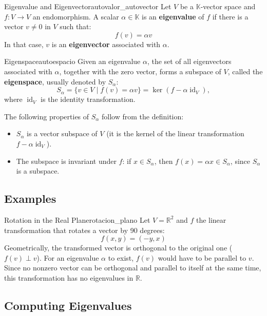 \documentclass[11pt, a4paper]{article}
\begin{document}
\begin{definicion}{Eigenvalue and Eigenvector}{autovalor_autovector}
Let $V$ be a $\mathbb{K}$-vector space and $f: V \to V$ an endomorphism.
A scalar $\alpha \in \mathbb{K}$ is an \textbf{eigenvalue} of $f$ if there is a vector $v \neq 0$ in $V$ such that:
\[ f(v) = \alpha v \]
In that case, $v$ is an \textbf{eigenvector} associated with $\alpha$.
\end{definicion}

\begin{definicion}{Eigenspace}{autoespacio}
Given an eigenvalue $\alpha$, the set of all eigenvectors associated with $\alpha$, together with the zero vector, forms a subspace of $V$, called the \textbf{eigenspace}, usually denoted by $S_\alpha$:
\[ S_\alpha = \{ v \in V \mid f(v) = \alpha v \} = \ker(f - \alpha \operatorname{id}_V), \]
where $\operatorname{id}_V$ is the identity transformation.
\end{definicion}

\obs The following properties of $S_\alpha$ follow from the definition:
\begin{itemize}
    \item $S_\alpha$ is a vector subspace of $V$ (it is the kernel of the linear transformation $f - \alpha \operatorname{id}_V$).
    \item The subspace is invariant under $f$: if $x \in S_\alpha$, then $f(x) = \alpha x \in S_\alpha$, since $S_\alpha$ is a subspace.
\end{itemize}

\subsection{Examples}

\begin{ejemplo}{Rotation in the Real Plane}{rotacion_plano}
Let $V = \mathbb{R}^2$ and $f$ the linear transformation that rotates a vector by 90 degrees:
\[ f(x, y) = (-y, x) \]
Geometrically, the transformed vector is orthogonal to the original one ($f(v) \perp v$). For an eigenvalue $\alpha$ to exist, $f(v)$ would have to be parallel to $v$. Since no nonzero vector can be orthogonal and parallel to itself at the same time, this transformation has no eigenvalues in $\mathbb{R}$.
\end{ejemplo}

\subsection{Computing Eigenvalues}
\end{document}
